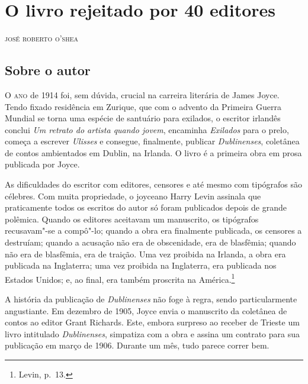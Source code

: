 \chapter{O livro rejeitado por 40 editores}

\begin{flushright}
\textsc{josé roberto o’shea}
\end{flushright}

\section{Sobre o autor}

\noindent\textsc{O ano} de 1914 foi, sem dúvida, crucial na carreira literária de James
Joyce. Tendo fixado residência em Zurique, que com o advento da Primeira Guerra
Mundial se torna uma espécie de santuário para exilados, o escritor irlandês
conclui \textit{Um retrato do artista quando jovem}, encaminha \textit{Exilados} para o
prelo, começa a escrever \textit{Ulisses} e consegue, finalmente, publicar
\textit{Dublinenses}, coletânea de contos ambientados em Dublin, na Irlanda. O
livro é a primeira obra em prosa publicada por Joyce.

As dificuldades do escritor com editores, censores e até mesmo com tipógrafos
são célebres. Com muita propriedade, o joyceano Harry Levin assinala que
praticamente todos os escritos do autor só foram publicados depois de grande
polêmica. Quando os editores aceitavam um manuscrito, os tipógrafos
recusavam"-se a compô"-lo; quando a obra era finalmente publicada, os censores a
destruíam; quando a acusação não era de obscenidade, era de blasfêmia; quando
não era de blasfêmia, era de traição.  Uma vez proibida na Irlanda, a obra era
publicada na Inglaterra; uma vez proibida na Inglaterra, era publicada nos
Estados Unidos; e, ao final, era também proscrita na América.\footnote{ Levin, p.~13.}


A história da publicação de \textit{Dublinenses} não foge à regra, sendo
particularmente angustiante. Em dezembro de 1905, Joyce envia o manuscrito da
coletânea de contos ao editor Grant Richards. Este, embora surpreso ao receber
de Trieste um livro intitulado \textit{Dublinenses}, simpatiza com a obra e
assina um contrato para sua publicação em março de 1906. Durante um mês, tudo
parece correr bem.

